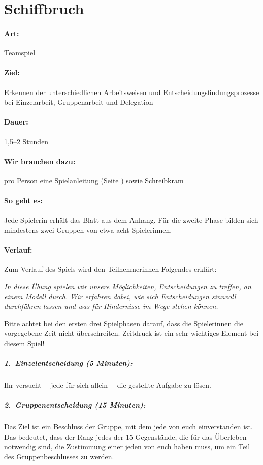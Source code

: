 \section{Schiffbruch}
\label{schiffbruch}
\paragraph{Art:} Teamspiel
\paragraph{Ziel:} Erkennen der unterschiedlichen Arbeitsweisen und Entscheidungsfindungsprozesse bei Einzelarbeit, Gruppenarbeit und Delegation
\paragraph{Dauer:} 1,5--2 Stunden
\paragraph{Wir brauchen dazu:} pro Person eine Spielanleitung (Seite \pageref{schiffbruch-kopien}) sowie Schreibkram
\paragraph{So geht es:} Jede Spielerin erhält das Blatt aus dem Anhang. Für die zweite Phase bilden sich mindestens zwei Gruppen von etwa acht Spielerinnen.
\paragraph{Verlauf:} Zum Verlauf des Spiels wird den Teilnehmerinnen Folgendes erklärt:

\emph{In diese Übung spielen wir unsere Möglichkeiten, Entscheidungen zu treffen, an einem Modell durch. Wir erfahren dabei, wie sich Entscheidungen sinnvoll durchführen lassen und was für Hindernisse im Wege stehen können.}

Bitte achtet bei den ersten drei Spielphasen darauf, dass die Spielerinnen die vorgegebene Zeit nicht überschreiten. Zeitdruck ist ein sehr wichtiges Element bei diesem Spiel!
\subparagraph{1.~Einzelentscheidung (5 Minuten):} Ihr versucht~-- jede für sich allein~-- die gestellte Aufgabe zu lösen.
\subparagraph{2.~Gruppenentscheidung (15 Minuten):} Das Ziel ist ein Beschluss der Gruppe, mit dem jede von euch einverstanden ist. Das bedeutet, dass der Rang jedes der 15 Gegenstände, die für das Überleben notwendig sind, die Zustimmung einer jeden von euch haben muss, um ein Teil des Gruppenbeschlusses zu werden.

